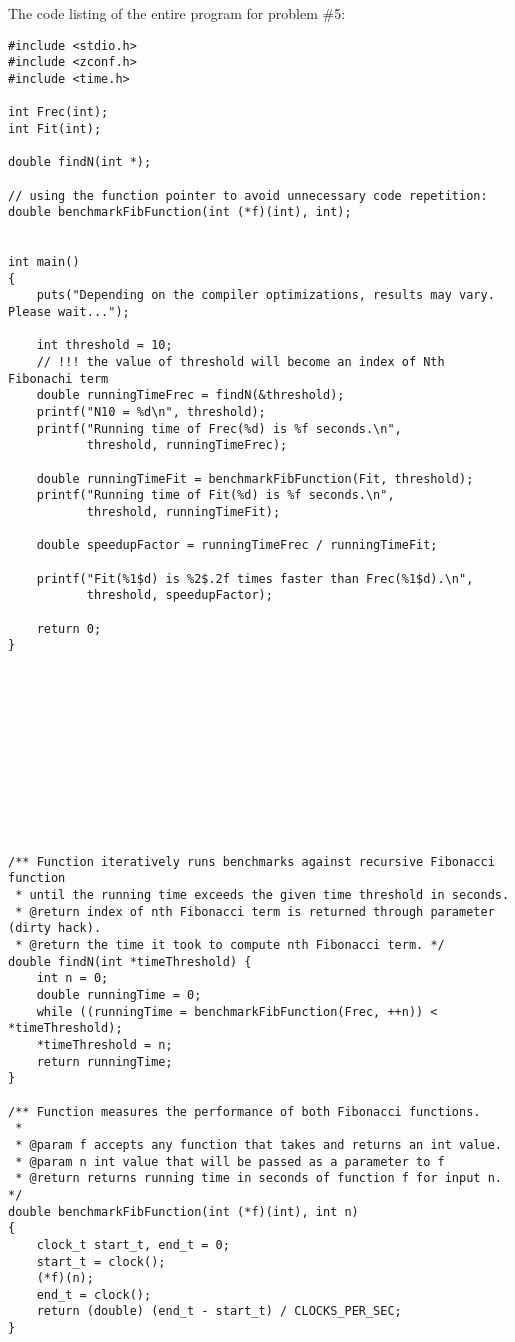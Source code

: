 \documentclass{article}
\begin{document}
		\noindent The code listing of the entire program for problem \#5: 
		\begin{verbatim}
#include <stdio.h>
#include <zconf.h>
#include <time.h>

int Frec(int);
int Fit(int);

double findN(int *);

// using the function pointer to avoid unnecessary code repetition:
double benchmarkFibFunction(int (*f)(int), int);


int main()
{
    puts("Depending on the compiler optimizations, results may vary. Please wait...");

    int threshold = 10;
    // !!! the value of threshold will become an index of Nth Fibonachi term
    double runningTimeFrec = findN(&threshold);
    printf("N10 = %d\n", threshold);
    printf("Running time of Frec(%d) is %f seconds.\n", 
           threshold, runningTimeFrec);

    double runningTimeFit = benchmarkFibFunction(Fit, threshold);
    printf("Running time of Fit(%d) is %f seconds.\n", 
           threshold, runningTimeFit);

    double speedupFactor = runningTimeFrec / runningTimeFit;

    printf("Fit(%1$d) is %2$.2f times faster than Frec(%1$d).\n",
           threshold, speedupFactor);

    return 0;
}












/** Function iteratively runs benchmarks against recursive Fibonacci function
 * until the running time exceeds the given time threshold in seconds.
 * @return index of nth Fibonacci term is returned through parameter (dirty hack).
 * @return the time it took to compute nth Fibonacci term. */
double findN(int *timeThreshold) {
    int n = 0;
    double runningTime = 0;
    while ((runningTime = benchmarkFibFunction(Frec, ++n)) < *timeThreshold);
    *timeThreshold = n;         
    return runningTime;
}

/** Function measures the performance of both Fibonacci functions.
 *
 * @param f accepts any function that takes and returns an int value.
 * @param n int value that will be passed as a parameter to f
 * @return returns running time in seconds of function f for input n. */
double benchmarkFibFunction(int (*f)(int), int n)
{
    clock_t start_t, end_t = 0;
    start_t = clock();
    (*f)(n);
    end_t = clock();
    return (double) (end_t - start_t) / CLOCKS_PER_SEC;
}


\end{verbatim}
\end{document}
